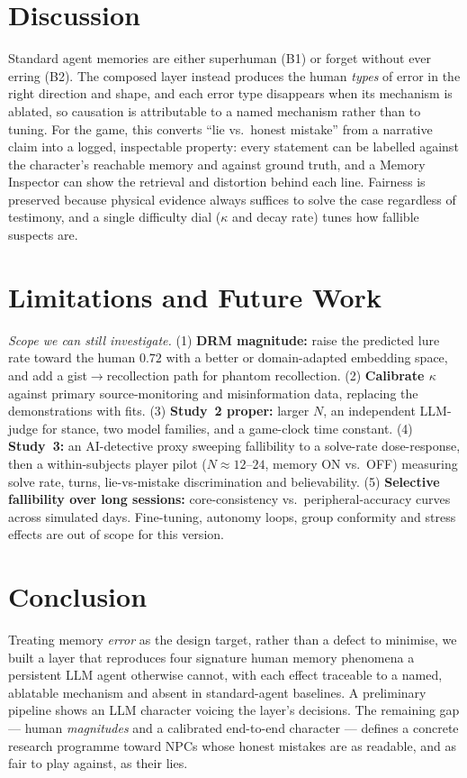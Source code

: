 \documentclass[conference]{IEEEtran}
\begin{document}
\section{Discussion}
Standard agent memories are either superhuman (B1) or forget without ever erring
(B2). The composed layer instead produces the human \emph{types} of error in the
right direction and shape, and each error type disappears when its mechanism is
ablated, so causation is attributable to a named mechanism rather than to tuning.
For the game, this converts ``lie vs.\ honest mistake'' from a narrative claim into
a logged, inspectable property: every statement can be labelled against the
character's reachable memory and against ground truth, and a Memory Inspector can
show the retrieval and distortion behind each line. Fairness is preserved because
physical evidence always suffices to solve the case regardless of testimony, and a
single difficulty dial ($\kappa$ and decay rate) tunes how fallible suspects are.

\section{Limitations and Future Work}
\emph{Scope we can still investigate.} (1) \textbf{DRM magnitude:} raise the
predicted lure rate toward the human $0.72$ with a better or domain-adapted
embedding space, and add a gist$\to$recollection path for phantom recollection.
(2) \textbf{Calibrate $\kappa$} against primary source-monitoring and
misinformation data, replacing the demonstrations with fits. (3) \textbf{Study~2
proper:} larger $N$, an independent LLM-judge for stance, two model families, and a
game-clock time constant. (4) \textbf{Study~3:} an AI-detective proxy sweeping
fallibility to a solve-rate dose-response, then a within-subjects player pilot
($N\!\approx\!12$--$24$, memory ON vs.\ OFF) measuring solve rate, turns,
lie-vs-mistake discrimination and believability. (5) \textbf{Selective
fallibility over long sessions:} core-consistency vs.\ peripheral-accuracy curves
across simulated days. Fine-tuning, autonomy loops, group conformity and stress
effects are out of scope for this version.

\section{Conclusion}
Treating memory \emph{error} as the design target, rather than a defect to
minimise, we built a layer that reproduces four signature human memory phenomena a
persistent LLM agent otherwise cannot, with each effect traceable to a named,
ablatable mechanism and absent in standard-agent baselines. A preliminary pipeline
shows an LLM character voicing the layer's decisions. The remaining gap --- human
\emph{magnitudes} and a calibrated end-to-end character --- defines a concrete
research programme toward NPCs whose honest mistakes are as readable, and as
fair to play against, as their lies.
\end{document}
